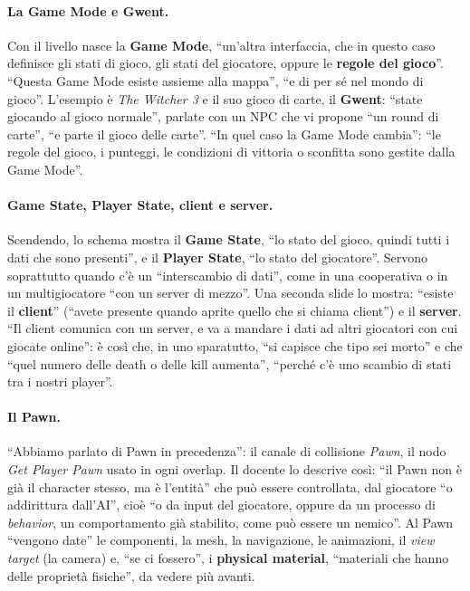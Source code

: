 \paragraph{La Game Mode e Gwent.} Con il livello nasce la \textbf{Game Mode}, ``un'altra
interfaccia, che in questo caso definisce gli stati di gioco, gli stati del giocatore,
oppure le \textbf{regole del gioco}''. ``Questa Game Mode esiste assieme alla mappa'',
``e di per sé nel mondo di gioco''. L'esempio è \emph{The Witcher 3} e il suo gioco di
carte, il \textbf{Gwent}: ``state giocando al gioco normale'', parlate con un NPC che vi
propone ``un round di carte'', ``e parte il gioco delle carte''. ``In quel caso la Game
Mode cambia'': ``le regole del gioco, i punteggi, le condizioni di vittoria o sconfitta
sono gestite dalla Game Mode''.

\paragraph{Game State, Player State, client e server.} Scendendo, lo schema mostra il
\textbf{Game State}, ``lo stato del gioco, quindi tutti i dati che sono presenti'', e il
\textbf{Player State}, ``lo stato del giocatore''. Servono soprattutto quando c'è un
``interscambio di dati'', come in una cooperativa o in un multigiocatore ``con un server
di mezzo''. Una seconda slide lo mostra: ``esiste il \textbf{client}'' (``avete presente
quando aprite quello che si chiama client'') e il \textbf{server}. ``Il client comunica
con un server, e va a mandare i dati ad altri giocatori con cui giocate online'': è così
che, in uno sparatutto, ``si capisce che tipo sei morto'' e che ``quel numero delle death
o delle kill aumenta'', ``perché c'è uno scambio di stati tra i nostri player''.

\paragraph{Il Pawn.} ``Abbiamo parlato di Pawn in precedenza'': il canale di collisione
\emph{Pawn}, il nodo \emph{Get Player Pawn} usato in ogni overlap. Il docente lo descrive
così: ``il Pawn non è già il character stesso, ma è l'entità'' che può essere
controllata, dal giocatore ``o addirittura dall'AI'', cioè ``o da input del giocatore,
oppure da un processo di \emph{behavior}, un comportamento già stabilito, come può essere
un nemico''. Al Pawn ``vengono date'' le componenti, la mesh, la navigazione, le
animazioni, il \emph{view target} (la camera) e, ``se ci fossero'', i \textbf{physical
material}, ``materiali che hanno delle proprietà fisiche'', da vedere più avanti.

